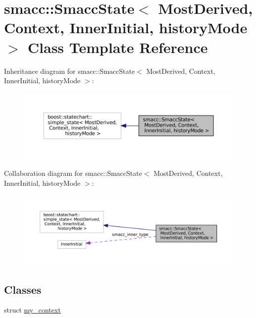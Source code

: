 \hypertarget{classsmacc_1_1SmaccState}{}\section{smacc\+:\+:Smacc\+State$<$ Most\+Derived, Context, Inner\+Initial, history\+Mode $>$ Class Template Reference}
\label{classsmacc_1_1SmaccState}


Inheritance diagram for smacc\+:\+:Smacc\+State$<$ Most\+Derived, Context, Inner\+Initial, history\+Mode $>$\+:
\nopagebreak
\begin{figure}[H]
\begin{center}
\leavevmode
\includegraphics[width=350pt]{classsmacc_1_1SmaccState__inherit__graph}
\end{center}
\end{figure}


Collaboration diagram for smacc\+:\+:Smacc\+State$<$ Most\+Derived, Context, Inner\+Initial, history\+Mode $>$\+:
\nopagebreak
\begin{figure}[H]
\begin{center}
\leavevmode
\includegraphics[width=350pt]{classsmacc_1_1SmaccState__coll__graph}
\end{center}
\end{figure}
\subsection*{Classes}
\begin{DoxyCompactItemize}
\item 
struct \hyperlink{structsmacc_1_1SmaccState_1_1my__context}{my\+\_\+context}
\end{DoxyCompactItemize}
